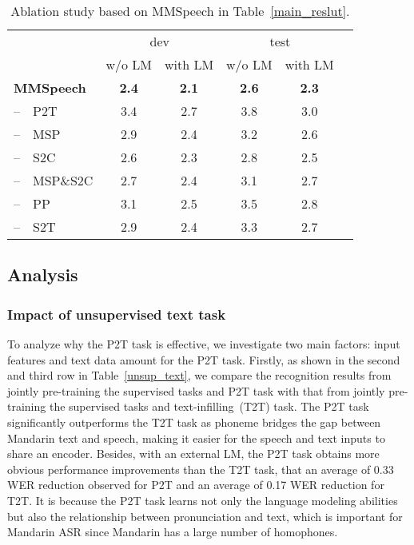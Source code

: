 \documentclass{article}
\begin{document}
\begin{table}[htb]
	\centering
	\caption{Ablation study based on MMSpeech in Table~\ref{main_reslut}.}
    \label{ablation_study}
	\begin{tabular}{l c c c c c}
		\toprule
		& \multicolumn{2}{c}{dev} & \multicolumn{2}{c}{test} \\
        \cmidrule(lr){2-3} \cmidrule(lr){4-5}
         & w/o LM & with LM & w/o LM & with LM \\
		\midrule
        \textbf{MMSpeech}        & \textbf{2.4}   & \textbf{2.1}   & \textbf{2.6} & \textbf{2.3}\\
        --~~P2T         & 3.4   & 2.7   & 3.8 & 3.0 \\
        --~~MSP         & 2.9   & 2.4   & 3.2 & 2.6\\
        --~~S2C         & 2.6   & 2.3   & 2.8 & 2.5 \\
        --~~MSP\&S2C    & 2.7   & 2.4  & 3.1 & 2.7 \\
        --~~PP          & 3.1   & 2.5  & 3.5 & 2.8 \\
        --~~S2T         & 2.9   & 2.4  & 3.3 & 2.7 \\
		\bottomrule
	\end{tabular}
\end{table}


\subsection{Analysis}
\label{sec:an}
\subsubsection{Impact of unsupervised text task} 
To analyze why the P2T task is effective, we investigate two main factors: input features and text data amount for the P2T task. Firstly, as shown in the second and third row in Table~\ref{unsup_text}, we compare the recognition results from jointly pre-training the supervised tasks and P2T task with that from jointly pre-training the supervised tasks and text-infilling~(T2T) task. The P2T task significantly outperforms the T2T task as phoneme bridges the gap between Mandarin text and speech, making it easier for the speech and text inputs to share an encoder. Besides, with an external LM, the P2T task obtains more obvious performance improvements than the T2T task, that an average of 0.33 WER reduction observed for P2T and an average of 0.17 WER reduction for T2T. It is because the P2T task learns not only the language modeling abilities but also the relationship between pronunciation and text, which is important for Mandarin ASR since Mandarin has a large number of homophones. 
\end{document}
